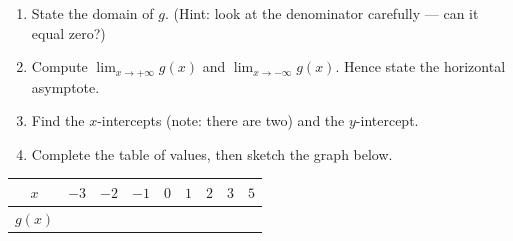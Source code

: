 \documentclass[12pt, twoside]{article}
\begin{document}
\begin{enumerate}[itemsep=0.4cm]
\begin{enumerate}[label=(\alph*), itemsep=0.3cm]
  \item State the domain of $g$. (Hint: look at the denominator
  carefully --- can it equal zero?)

  \vspace{1.6cm}

  \item Compute $\displaystyle\lim_{x\to+\infty}g(x)$ and
  $\displaystyle\lim_{x\to-\infty}g(x)$. Hence state the
  horizontal asymptote.

  \vspace{2.2cm}

  \item Find the $x$-intercepts (note: there are two) and the
  $y$-intercept.

  \vspace{2.6cm}

  \item Complete the table of values, then sketch the graph
  below.
\end{enumerate}

\vspace{0.2cm}
\begin{center}
\renewcommand{\arraystretch}{1.6}
\begin{tabular}{|c|c|c|c|c|c|c|c|c|}
\hline
$x$    & $-3$ & $-2$ & $-1$ & $0$ & $1$ & $2$ & $3$ & $5$ \\
\hline
$g(x)$ & \phantom{XXXX} & \phantom{XXXX} & \phantom{XXXX} & \phantom{XXXX} & \phantom{XXXX} & \phantom{XXXX} & \phantom{XXXX} & \phantom{XXXX} \\
\hline
\end{tabular}
\end{center}

\begin{figure}[H]
\begin{center}
\end{center}
\end{figure}
\end{enumerate}
\end{document}
